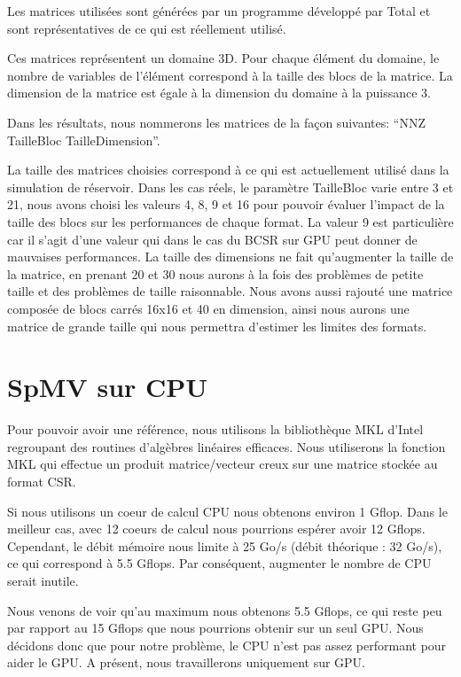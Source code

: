 \documentclass[a4paper,11pt]{report}
\begin{document}
  Les matrices utilisées sont générées par un programme développé par
  Total et sont représentatives de ce qui est réellement utilisé.
  
  Ces matrices représentent un domaine 3D. Pour chaque élément du
  domaine, le nombre de variables de l'élément correspond à la taille
  des blocs de la matrice. La dimension de la matrice est égale à la
  dimension du domaine à la puissance 3. 
  
  Dans les résultats, nous nommerons les matrices de la façon
  suivantes: ``NNZ TailleBloc TailleDimension''.
  
  La taille des matrices choisies correspond à ce
  qui est actuellement utilisé dans la simulation de réservoir. 
  Dans les cas réels, le paramètre TailleBloc varie entre 3 et 21,
  nous avons choisi les valeurs 4, 8, 9 et 16 pour pouvoir évaluer
  l'impact de la taille des blocs sur les performances de chaque
  format. La valeur 9 est particulière car il s'agit d'une valeur qui
  dans le cas du BCSR sur GPU peut donner de mauvaises performances.
  La taille des
  dimensions ne fait qu'augmenter la taille de la matrice, en prenant
  20 et 30 nous aurons à la fois des problèmes de petite taille et
  des problèmes de taille raisonnable. Nous avons aussi rajouté une
  matrice composée de blocs carrés 16x16 et 40 en dimension, ainsi nous
  aurons une matrice de grande taille qui nous permettra d'estimer
  les limites des formats.

 \section{SpMV sur CPU}
  Pour pouvoir avoir une référence, nous utilisons la bibliothèque MKL
  d'Intel regroupant des routines d'algèbres linéaires efficaces.
  Nous utiliserons la fonction MKL qui effectue un produit
  matrice/vecteur creux sur une matrice stockée au format CSR.
  

  Si nous utilisons un coeur de calcul CPU nous obtenons environ 1
  Gflop. Dans le meilleur cas, avec 12 coeurs de calcul nous
  pourrions espérer avoir 12 Gflops. Cependant, le débit mémoire nous limite à 25
  Go/s (débit théorique : 32 Go/s), ce qui correspond à 5.5 Gflops.
  Par conséquent, augmenter le nombre de CPU serait inutile.

  Nous venons de voir qu'au maximum nous obtenons 5.5 Gflops, ce qui
  reste peu par rapport au 15 Gflops que nous pourrions obtenir sur un
  seul GPU\cite{VOFG10Improving}. Nous décidons donc que pour notre
  problème, le CPU n'est pas assez performant pour aider le GPU. A
  présent, nous travaillerons uniquement sur GPU.
\end{document}

